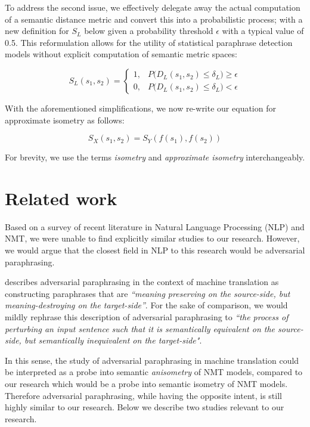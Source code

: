 \documentclass[11pt,a4paper]{article}
\begin{document}
To address the second issue, we effectively delegate away the actual computation of a semantic distance metric and convert this into a probabilistic process; with a new definition for $S_L$ below given a probability threshold $\epsilon$ with a typical value of 0.5. This reformulation allows for the utility of statistical paraphrase detection models without explicit computation of semantic metric spaces:

\begin{equation}
  \label{bounded_isometry_probability_eqn}
  S_L(s_1,s_2) =
  \begin{cases}
    1, &P\big(D_L(s_1,s_2) \leq \delta_L\big) \geq \epsilon \\
    0, &P\big(D_L(s_1,s_2) \leq \delta_L\big) < \epsilon
  \end{cases}
\end{equation}

With the aforementioned simplifications, we now re-write our equation for approximate isometry as follows:

\begin{equation}  
  \label{exact_approx_isometry_eqn}
  S_X(s_1,s_2) = S_Y(f(s_1),f(s_2))
\end{equation}

For brevity, we use the terms \textit{isometry} and \textit{approximate isometry} interchangeably.

\section{Related work}

Based on a survey of recent literature in Natural Language Processing (NLP) and NMT, we were unable to find explicitly similar studies to our research. However, we would argue that the closest field in NLP to this research would be adversarial paraphrasing.

\citet{michel2019evaluation} describes adversarial paraphrasing in the context of machine translation as constructing paraphrases that are \textit{``meaning preserving on the source-side, but meaning-destroying on the target-side''}. For the sake of comparison, we would mildly rephrase this description of adversarial paraphrasing to \textit{``the process of perturbing an input sentence such that it is semantically equivalent on the source-side, but semantically inequivalent on the target-side"}.

In this sense, the study of adversarial paraphrasing in machine translation could be interpreted as a probe into semantic \textit{anisometry} of NMT models, compared to our research which would be a probe into semantic isometry of NMT models. Therefore adversarial paraphrasing, while having the opposite intent, is still highly similar to our research. Below we describe two studies relevant to our research.
\end{document}
